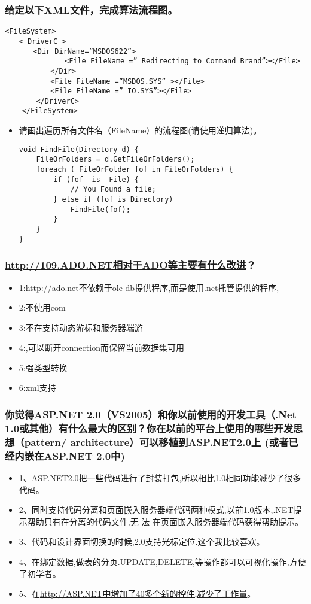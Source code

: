 \documentclass[9pt, b5paper]{article}
\begin{document}
\subsubsection{给定以下XML文件，完成算法流程图。}
\label{sec-1-2-124}
\begin{verbatim}
<FileSystem> 
　　< DriverC > 
　　　　<Dir DirName=”MSDOS622”> 
    　　　　　　<File FileName =” Redirecting to Command Brand”></File>
    　　　　</Dir> 
    　　　　<File FileName =”MSDOS.SYS” ></File>
    　　　　<File FileName =” IO.SYS”></File> 
    　　</DriverC> 
    </FileSystem>
\end{verbatim}
\begin{itemize}
\item 请画出遍历所有文件名（FileName）的流程图(请使用递归算法)。
\begin{verbatim}
void FindFile(Directory d) { 
    FileOrFolders = d.GetFileOrFolders(); 
    foreach ( FileOrFolder fof in FileOrFolders) {
        if (fof  is  File) {
            // You Found a file; 
        } else if (fof is Directory) 
            FindFile(fof);                       　　
        }
    }
}
\end{verbatim}
\end{itemize}
\subsubsection{\url{http://109.ADO.NET相对于ADO等主要有什么改进}？}
\label{sec-1-2-125}
\begin{itemize}
\item 1:\url{http://ado.net不依赖于ole} db提供程序,而是使用.net托管提供的程序,
\item 2:不使用com
\item 3:不在支持动态游标和服务器端游
\item 4:,可以断开connection而保留当前数据集可用
\item 5:强类型转换
\item 6:xml支持
\end{itemize}
\subsubsection{你觉得ASP.NET 2.0（VS2005）和你以前使用的开发工具（.Net 1.0或其他）有什么最大的区别？你在以前的平台上使用的哪些开发思想（pattern/ architecture）可以移植到ASP.NET2.0上 (或者已经内嵌在ASP.NET 2.0中)}
\label{sec-1-2-126}
\begin{itemize}
\item 1、ASP.NET2.0把一些代码进行了封装打包,所以相比1.0相同功能减少了很多代码。
\item 2、同时支持代码分离和页面嵌入服务器端代码两种模式,以前1.0版本,.NET提示帮助只有在分离的代码文件,无 法 在页面嵌入服务器端代码获得帮助提示。
\item 3、代码和设计界面切换的时候,2.0支持光标定位.这个我比较喜欢。
\item 4、在绑定数据,做表的分页.UPDATE,DELETE,等操作都可以可视化操作,方便了初学者。
\item 5、在\url{http://ASP.NET中增加了40多个新的控件,减少了工作量}。
\end{itemize}
\end{document}
